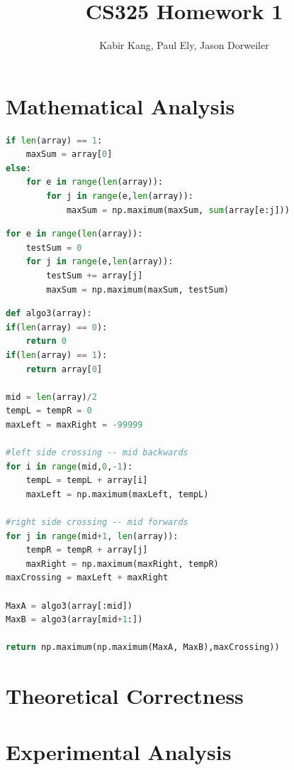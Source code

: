 \documentclass[a4paper,12pt]{article}
\title{CS325 Homework 1}
\author{Kabir Kang, Paul Ely, Jason Dorweiler}
\begin{document}
\maketitle

\section*{Mathematical Analysis}


  \begin{lstlisting}[language=python,caption={pseudo code for $n^3$ algorithm}]
if len(array) == 1:
	maxSum = array[0]
else:
	for e in range(len(array)):
		for j in range(e,len(array)):
			maxSum = np.maximum(maxSum, sum(array[e:j]))
  \end{lstlisting}
  
  \begin{lstlisting}[language=python,caption={pseudo code for $n^2$ algorithm}]
for e in range(len(array)):
	testSum = 0
	for j in range(e,len(array)):
		testSum += array[j]
		maxSum = np.maximum(maxSum, testSum)
  \end{lstlisting}

  \begin{lstlisting}[language=python,caption={pseudo code for $n\log(n)$ algorithm}]
def algo3(array):
if(len(array) == 0):
	return 0
if(len(array) == 1):
	return array[0]

mid = len(array)/2
tempL = tempR = 0
maxLeft = maxRight = -99999

#left side crossing -- mid backwards
for i in range(mid,0,-1):
	tempL = tempL + array[i]
	maxLeft = np.maximum(maxLeft, tempL)

#right side crossing -- mid forwards
for j in range(mid+1, len(array)):
	tempR = tempR + array[j]
	maxRight = np.maximum(maxRight, tempR)
maxCrossing = maxLeft + maxRight

MaxA = algo3(array[:mid])
MaxB = algo3(array[mid+1:])

return np.maximum(np.maximum(MaxA, MaxB),maxCrossing))
  \end{lstlisting} 

\section*{Theoretical Correctness}

\section*{Experimental Analysis}
\end{document}
